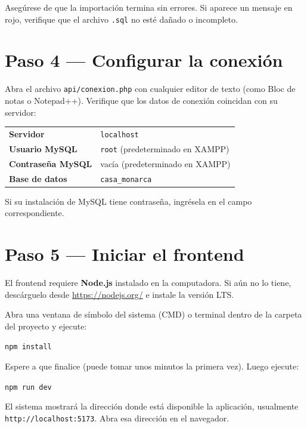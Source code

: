 \documentclass[10pt,letterpaper]{report}
\begin{document}
\begin{importantebox}
Asegúrese de que la importación termina sin errores. Si aparece un mensaje en rojo, verifique que el archivo \texttt{.sql} no esté dañado o incompleto.
\end{importantebox}

\section{Paso 4 — Configurar la conexión}

Abra el archivo \texttt{api/conexion.php} con cualquier editor de texto (como Bloc de notas o Notepad++). Verifique que los datos de conexión coincidan con su servidor:

\begin{center}
\begin{tabular}{ll}
\textbf{Servidor} & \texttt{localhost} \\
\textbf{Usuario MySQL} & \texttt{root} (predeterminado en XAMPP) \\
\textbf{Contraseña MySQL} & vacía (predeterminado en XAMPP) \\
\textbf{Base de datos} & \texttt{casa\_monarca} \\
\end{tabular}
\end{center}

Si su instalación de MySQL tiene contraseña, ingrésela en el campo correspondiente.

\section{Paso 5 — Iniciar el frontend}

El frontend requiere \textbf{Node.js} instalado en la computadora. Si aún no lo tiene, descárguelo desde \url{https://nodejs.org/} e instale la versión LTS.

Abra una ventana de símbolo del sistema (CMD) o terminal dentro de la carpeta del proyecto y ejecute:

\begin{center}
\texttt{npm install}
\end{center}

Espere a que finalice (puede tomar unos minutos la primera vez). Luego ejecute:

\begin{center}
\texttt{npm run dev}
\end{center}

El sistema mostrará la dirección donde está disponible la aplicación, usualmente \texttt{http://localhost:5173}. Abra esa dirección en el navegador.
\end{document}
